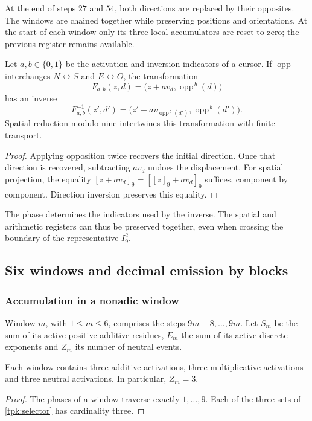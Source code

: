 At the end of steps \(27\) and \(54\), both directions are replaced
by their opposites. The windows are chained together while preserving positions and
orientations. At the start of each window only its three local
accumulators are reset to zero; the previous register remains available.

\begin{proposicion}
\label{tpk:inversion}
Let \(a,b\in\{0,1\}\) be the activation and inversion indicators of a
cursor. If \(\operatorname{opp}\) interchanges \(N\leftrightarrow S\) and
\(E\leftrightarrow O\), the transformation
\[
 F_{a,b}(z,d)=\bigl(z+a v_d,\operatorname{opp}^{\,b}(d)\bigr)
\]
has an inverse
\[
 F_{a,b}^{-1}(z',d')=
 \bigl(z'-a v_{\operatorname{opp}^{\,b}(d')},
       \operatorname{opp}^{\,b}(d')\bigr).
\]
Spatial reduction modulo nine intertwines this transformation with
finite transport.
\end{proposicion}
\begin{proof}
Applying opposition twice recovers the initial direction. Once
that direction is recovered, subtracting \(a v_d\) undoes the displacement.
For spatial projection, the equality
\([z+a v_d]_9=[[z]_9+a v_d]_9\) suffices, component by component. Direction inversion
preserves this equality.
\end{proof}

The phase determines the indicators used by the inverse. The spatial
and arithmetic registers can thus be preserved together, even when
crossing the boundary of the representative \(I_9^2\).

\subsection{Six windows and decimal emission by blocks}
\label{tpk:emision}

\subsubsection{Accumulation in a nonadic window}

Window \(m\), with \(1\leq m\leq6\), comprises the steps
\(9m-8,\ldots,9m\). Let \(S_m\) be the sum of its active positive additive
residues, \(E_m\) the sum of its active discrete exponents and
\(Z_m\) its number of neutral events.

\begin{lema}
\label{tpk:tres-eventos}
Each window contains three additive activations, three multiplicative activations and
three neutral activations. In particular, \(Z_m=3\).
\end{lema}
\begin{proof}
The phases of a window traverse exactly \(1,\ldots,9\). Each
of the three sets of \eqref{tpk:selector} has cardinality three.
\end{proof}

